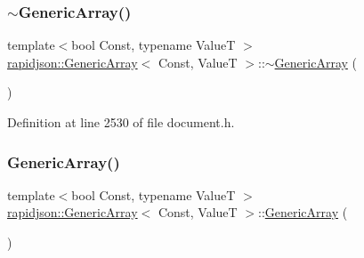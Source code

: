 \subsubsection{\texorpdfstring{$\sim$GenericArray()}{~GenericArray()}}
{\footnotesize\ttfamily template$<$bool Const, typename ValueT $>$ \\
\mbox{\hyperlink{classrapidjson_1_1_generic_array}{rapidjson\+::\+Generic\+Array}}$<$ Const, ValueT $>$\+::$\sim$\mbox{\hyperlink{classrapidjson_1_1_generic_array}{Generic\+Array}} (\begin{DoxyParamCaption}{ }\end{DoxyParamCaption})}



Definition at line 2530 of file document.\+h.


\begin{DoxyCode}{0}

\end{DoxyCode}
\mbox{\label{classrapidjson_1_1_generic_array_a2c2f6824d1243d316baeaffd2ff878f7}} 
\subsubsection{\texorpdfstring{GenericArray()}{GenericArray()}\hspace{0.1cm}{\footnotesize\ttfamily [2/3]}}
{\footnotesize\ttfamily template$<$bool Const, typename ValueT $>$ \\
\mbox{\hyperlink{classrapidjson_1_1_generic_array}{rapidjson\+::\+Generic\+Array}}$<$ Const, ValueT $>$\+::\mbox{\hyperlink{classrapidjson_1_1_generic_array}{Generic\+Array}} (\begin{DoxyParamCaption}{ }\end{DoxyParamCaption})\hspace{0.3cm}{\ttfamily [private]}}

\mbox{\label{classrapidjson_1_1_generic_array_ab02177c7ee12063e26a6a99bc343df46}} 
